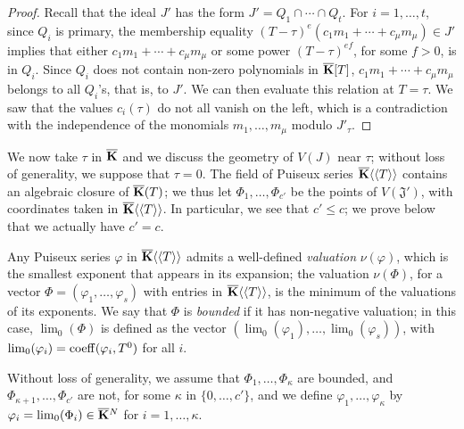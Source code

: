 \documentclass[12pt]{article}
\begin{document}
\begin{proof}
  Recall that the ideal $J'$ has the form $J'=Q_1 \cap \cdots \cap
  Q_t$. For $i=1,\dots,t$, since $Q_i$ is primary, the membership
  equality $(T-\tau)^e (c_1 m_1 +\cdots +c_\mu m_\mu) \in J'$ implies
  that either $c_1 m_1 +\cdots +c_\mu m_\mu$ or some power
  $(T-\tau)^{ef}$, for some $f > 0$, is in $Q_i$. Since $Q_i$ does not
  contain non-zero polynomials in $\overline{\mathbf{K}}[T]$, $c_1 m_1 +\cdots+ c_\mu
  m_\mu$ belongs to all $Q_i$'s, that is, to $J'$. We can then
  evaluate this relation at $T=\tau$. We saw that the values
  $c_i(\tau)$ do not all vanish on the left, which is a contradiction
  with the independence of the monomials $m_1,\dots,m_\mu$ modulo
  $J'_\tau$.
\end{proof}


We now take $\tau$ in $\overline{\mathbf{K}}$ and we discuss the geometry of $V(J)$
near $\tau$; without loss of generality, we suppose that $\tau=0$.
The field of Puiseux series $\overline{\mathbf{K}}\langle\langle T \rangle\rangle$
contains an algebraic closure of $\overline{\mathbf{K}}(T)$; we thus let
$\Phi_1,\dots,\Phi_{c'}$ be the points of $V(\mathfrak{J}')$, with
coordinates taken in $\overline{\mathbf{K}}\langle\langle T \rangle\rangle$. In
particular, we see that $c' \le c$; we prove below that we actually
have $c'=c$.

Any Puiseux series $\varphi$ in $\overline{\mathbf{K}}\langle\langle T
\rangle\rangle$ admits a well-defined {\em valuation} $\nu(\varphi)$,
which is the smallest exponent that appears in its expansion; the
valuation $\nu(\Phi)$, for a vector $\Phi=(\varphi_1,\dots,\varphi_s)$
with entries in $\overline{\mathbf{K}}\langle\langle T \rangle\rangle$, is the
minimum of the valuations of its exponents. We say that $\Phi$ is {\em
  bounded} if it has non-negative valuation; in this case,
$\lim_0(\Phi)$ is defined as the vector
$(\lim_0(\varphi_1),\dots,\lim_0(\varphi_s))$, with
$\lim_0(\varphi_i)={\rm coeff}(\varphi_i,T^0)$ for all $i$.

Without loss of generality, we assume that
$\Phi_1,\dots,\Phi_\kappa$ are bounded, and
$\Phi_{\kappa+1},\dots,\Phi_{c'}$ are not, for some $\kappa$ in
$\{0,\dots,c'\}$, and we define $\varphi_1,\dots,\varphi_\kappa$ by
$\varphi_i=\lim_0(\Phi_i)\in\overline{\mathbf{K}}{}^N$ for
$i=1,\dots,\kappa$.
\end{document}
